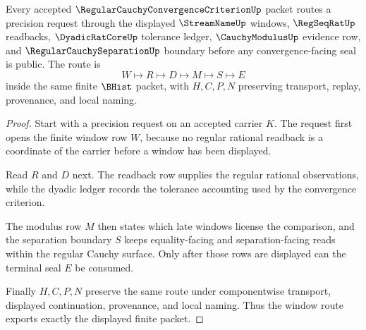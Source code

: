 \begin{theorem}
\label{thm:regular-cauchy-convergence-criterion-window-route}
Every accepted $\RegularCauchyConvergenceCriterionUp$ packet routes a precision request through the displayed $\StreamNameUp$ windows, $\RegSeqRatUp$ readbacks, $\DyadicRatCoreUp$ tolerance ledger, $\CauchyModulusUp$ evidence row, and $\RegularCauchySeparationUp$ boundary before any convergence-facing seal is public. The route is
$$
W \longmapsto R \longmapsto D \longmapsto M \longmapsto S \longmapsto E
$$
inside the same finite $\BHist$ packet, with $H,C,P,N$ preserving transport, replay, provenance, and local naming.
\end{theorem}
\begin{proof}
Start with a precision request on an accepted carrier $K$. The request first opens the finite window row $W$, because no regular rational readback is a coordinate of the carrier before a window has been displayed.

Read $R$ and $D$ next. The readback row supplies the regular rational observations, while the dyadic ledger records the tolerance accounting used by the convergence criterion.

The modulus row $M$ then states which late windows license the comparison, and the separation boundary $S$ keeps equality-facing and separation-facing reads within the regular Cauchy surface. Only after those rows are displayed can the terminal seal $E$ be consumed.

Finally $H,C,P,N$ preserve the same route under componentwise transport, displayed continuation, provenance, and local naming. Thus the window route exports exactly the displayed finite packet.
\end{proof}

